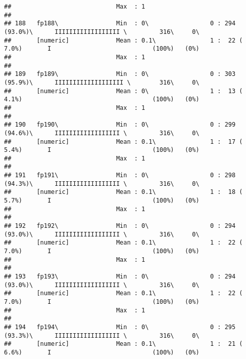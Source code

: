 \documentclass[]{article}
\begin{document}
\begin{verbatim}
##                             Max  : 1                                                                                       
## 
## 188   fp188\                Min  : 0\                 0 : 294 (93.0%)\      IIIIIIIIIIIIIIIIII \         316\     0\       
##       [numeric]             Mean : 0.1\               1 :  22 ( 7.0%)       I                            (100%)   (0%)     
##                             Max  : 1                                                                                       
## 
## 189   fp189\                Min  : 0\                 0 : 303 (95.9%)\      IIIIIIIIIIIIIIIIIII \        316\     0\       
##       [numeric]             Mean : 0\                 1 :  13 ( 4.1%)                                    (100%)   (0%)     
##                             Max  : 1                                                                                       
## 
## 190   fp190\                Min  : 0\                 0 : 299 (94.6%)\      IIIIIIIIIIIIIIIIII \         316\     0\       
##       [numeric]             Mean : 0.1\               1 :  17 ( 5.4%)       I                            (100%)   (0%)     
##                             Max  : 1                                                                                       
## 
## 191   fp191\                Min  : 0\                 0 : 298 (94.3%)\      IIIIIIIIIIIIIIIIII \         316\     0\       
##       [numeric]             Mean : 0.1\               1 :  18 ( 5.7%)       I                            (100%)   (0%)     
##                             Max  : 1                                                                                       
## 
## 192   fp192\                Min  : 0\                 0 : 294 (93.0%)\      IIIIIIIIIIIIIIIIII \         316\     0\       
##       [numeric]             Mean : 0.1\               1 :  22 ( 7.0%)       I                            (100%)   (0%)     
##                             Max  : 1                                                                                       
## 
## 193   fp193\                Min  : 0\                 0 : 294 (93.0%)\      IIIIIIIIIIIIIIIIII \         316\     0\       
##       [numeric]             Mean : 0.1\               1 :  22 ( 7.0%)       I                            (100%)   (0%)     
##                             Max  : 1                                                                                       
## 
## 194   fp194\                Min  : 0\                 0 : 295 (93.3%)\      IIIIIIIIIIIIIIIIII \         316\     0\       
##       [numeric]             Mean : 0.1\               1 :  21 ( 6.6%)       I                            (100%)   (0%)     

\end{verbatim}
\end{document}
